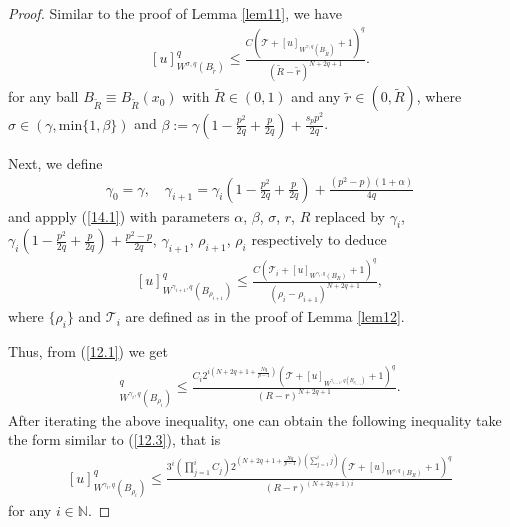 \documentclass[reqno,10pt]{amsart}
\numberwithin{equation}{section}
\begin{document}
\begin{proof}
	Similar to the proof of Lemma \ref{lem11}, we have 
	\begin{align}\label{14.1}
		[u]_{W^{\sigma, q}\left(B_{\tilde{r}}\right)}^q \leq \frac{C\left(\mathcal{T}+ [u]_{W^{\gamma, q}\left(B_{\widetilde{R}}\right)}+1\right)^q}{\left(\widetilde{R}-\tilde{r}\right)^{N+2q+1}}.
	\end{align}
	for any ball $B_{\widetilde{R}} \equiv B_{\widetilde{R}}\left(x_0\right)$ with $\widetilde{R}\in(0,1)$ and any $\tilde{r}\in (0,\widetilde{R})$, 
	where $\sigma\in \left(\gamma, \text{min}\{1, \beta\}\right)$ and $\beta:=\gamma\left(1-\frac{p^2}{2 q}+\frac{p}{2 q}\right)+\frac{s_p p^2}{2 q}$.\par
	Next, we define 
	\begin{align*}
		\gamma_0=\gamma, \quad \gamma_{i+1}=\gamma_i\left(1-\frac{p^2}{2 q}+\frac{p}{2 q}\right)+\frac{(p^2-p)(1+\alpha)}{4 q}
	\end{align*}
	and appply (\ref{14.1}) with parameters $\alpha$, $\beta$, $\sigma$, $r$, $R$ replaced by $\gamma_i$, $\gamma_i\left(1-\frac{p^2}{2 q}+\frac{p}{2 q}\right)+\frac{p^2-p}{2 q}$, $\gamma_{i+1}$, $\rho_{i+1}$, $\rho_i$ respectively to deduce
	\begin{align}\label{14.2}
		[u]_{W^{\gamma_{i+1},q}\left(B_{\rho_{i+1}}\right)}^q \leq \frac{C\left(\mathcal{T}_i+[u]_{W^{\gamma_i,q}\left(B_R\right)}+1\right)^q}{\left(\rho_i-\rho_{i+1}\right)^{N+2q+1}},
	\end{align}
	where $\{\rho_i\}$ and $\mathcal{T}_i$ are defined as in the proof of Lemma \ref{lem12}.\par
	Thus, from (\ref{12.1}) we get 
	\begin{align*}
		[u]_{W^{\gamma_i,q}\left(B_{\rho_ i}\right)}^q \leq \frac{C_i  2^{i\left(N+2q+1+\frac{Nq}{p-1}\right)}\left(\mathcal{T}+[u]_{W^{\gamma _{i-1}, q\left(B_{\rho_{i-1}}\right)}}+1\right)^q}{(R-r)^{N+2q+1}}.
	\end{align*}
	After iterating the above inequality, one can obtain the following inequality take the form similar to (\ref{12.3}), that is 
	\begin{align}\label{14.3}
		[u]_{W^{\gamma_i, q}\left(B_{\rho_i}\right)}^q \leq \frac{3^i\left(\prod\limits_{j=1}^i C_j\right) 2^{\left(N+2q+1+\frac{Nq}{p-1}\right)\left(\sum\limits_{j=1}^i j\right)}\left(\mathcal{T}+[u]_{W^{\gamma, q}\left(B_{R }\right)}+1\right)^q}{(R-r)^{(N+2 q+1) i}}
	\end{align}
	for any $i\in \mathbb{N}$.\par

\end{proof}
\end{document}
